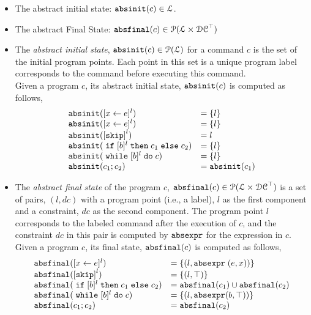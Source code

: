 %
\begin{itemize}
\item The abstract initial state: $\mathtt{abs}{\mathtt{init}}(c) \in \mathcal{L}$.
%
\item The abstract Final State: $\mathtt{abs}{\mathtt{final}}(c) \in \mathcal{P}(\mathcal{L} \times \mathcal{DC}^{\top})$
\end{itemize}

\begin{itemize}
  \item The \emph{abstract initial state}, $\mathtt{abs}{\mathtt{init}}(c) \in \mathcal{P}(\mathcal{L})$
  for a command $c$ is the set of the initial program points.
Each point in this set is a unique program label corresponds to the command before executing this command. 
\\
Given a program $c$, its abstract initial state, $\mathtt{abs}{\mathtt{init}}(c)$ is computed as follows,
%
\[
  \begin{array}{ll}
    \absinit(\clabel{\assign{x}{\expr}}{}^l)  & = \{l\}  \\
    \absinit(\clabel{\assign{x}{\expr}}{}^l)  & = \{l\} \\
    \absinit(\clabel{\eskip}^{l})  & = l \\
    \absinit(\eif [b]^l \ethen c_1 \eelse c_2)  & = \{l\} \\
    \absinit(\ewhile [b]^l \edo c)  & = \{l\} \\
    \absinit(c_1 ; c_2)  & = \absinit(c_1) \\
 \end{array}
 \]
%
%
\item The \emph{abstract final state} of the program $c$, 
$\mathtt{abs}{\mathtt{final}}(c) \in \mathcal{P}(\mathcal{L} \times \mathcal{DC}^{\top})$
is a set of pairs, $(l, dc)$ with a
program point (i.e., a label), $l$ as the first component and a constraint, 
$dc$ as the second component.
The program point $l$ corresponds to the labeled command after the execution of $c$,
and the constraint $dc$ in this pair is computed by $\mathtt{abs}{\mathtt{expr}}$ for the expression in $c$.
\\
Given a program $c$, its final state, $\mathtt{abs}{\mathtt{final}}(c)$ is computed as follows,
 \[
  \begin{array}{ll}
    \absfinal(\clabel{\assign{x}{\expr}}{}^l)  & = \{(l, \absexpr\eapp (\expr, x))\}  \\
     \absfinal(\clabel{\eskip}^{l})  
     & = \{(l, \top)\} \\
     \absfinal(\eif [b]^l \ethen c_1 \eelse c_2)  & = \absfinal(c_1) \cup \absfinal(c_2) \\
     \absfinal(\ewhile [b]^l \edo c)  & = \{(l, \absexpr(\bexpr, \top))\} \\
     \absfinal(c_1 ; c_2)  & =  \absfinal(c_2) \\
 \end{array}
 \]
\end{itemize}
